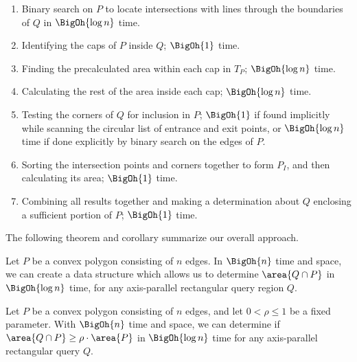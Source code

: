 \begin{enumerate}
 \item Binary search on $P$ to locate intersections with lines through the boundaries of $Q$ in $\BigOh{\log{n}}$ time.
 
 \item Identifying the caps of $P$ inside $Q$; $\BigOh{1}$ time.

 \item Finding the precalculated area within each cap in $T_P$; $\BigOh{\log{n}}$ time.

 \item Calculating the rest of the area inside each cap; $\BigOh{\log{n}}$ time.

 \item Testing the corners of $Q$ for inclusion in $P$; $\BigOh{1}$ if found implicitly while scanning the circular list of entrance and exit points, or $\BigOh{\log{n}}$ time if done explicitly by binary search on the edges of $P$.
 
 \item Sorting the intersection points and corners together to form $P_I$, and then calculating its area; $\BigOh{1}$ time.
 
 \item Combining all results together and making a determination about $Q$ enclosing a sufficient portion of $P$; $\BigOh{1}$ time.
 
\end{enumerate}

\noindent The following theorem and corollary summarize our overall approach.

\begin{theorem}
\label{th:convexp:area}
Let $P$ be a convex polygon consisting of $n$ edges. In $\BigOh{n}$ time and space, we can create a data structure which allows us to determine $\area{Q \cap P}$ in $\BigOh{\log{n}}$ time, for any axis-parallel rectangular query region $Q$.
\end{theorem}

\begin{corollary}
\label{cor:convexp:mp}
Let $P$ be a convex polygon consisting of $n$ edges, and let $0 < \rho \leq 1$ be a fixed parameter. With $\BigOh{n}$ time and space, we can determine if $\area{Q \cap P} \geq \rho \cdot \area{P}$ in $\BigOh{\log{n}}$ time for any axis-parallel rectangular query $Q$.
\end{corollary}


